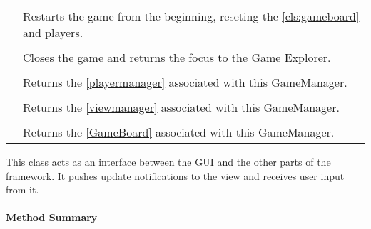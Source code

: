 \begin{longtable}{Lp{10cm}}
	& Restarts the game from the beginning, reseting the \ref{cls:gameboard} and players. \\
	 \\
	& Closes the game and returns the focus to the Game Explorer. \\
	 \\
	& Returns the \ref{playermanager} associated with this GameManager.\\
	 \\
	& Returns the \ref{viewmanager} associated with this GameManager.\\
	 \\
	& Returns the \ref{GameBoard} associated with this GameManager.\\
	

	\hline
\end{longtable}

This class acts as an interface between the \gls{GUI} and the other parts of the \gls{framework}. It pushes update notifications to the view and receives user input from it.  \\

\centerdash

\paragraph*{Method Summary}
